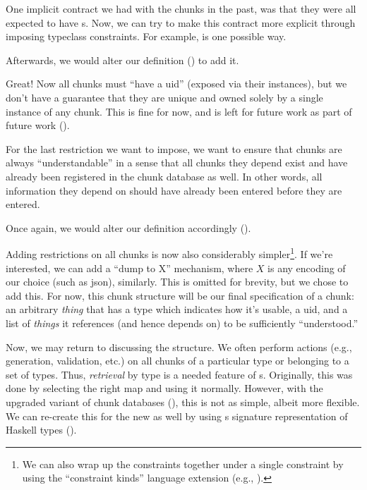 One implicit contract we had with the chunks in the past, was that they were all
expected to have \UID{}s. Now, we can try to make this contract more explicit
through imposing typeclass constraints. For example, 
is one possible way.

\uidOwnershipContract{}

Afterwards, we would alter our \Chunk{} definition
() to add it.

\chunksWithUidConstraint{}

Great! Now all chunks must ``have a \acs{uid}'' (exposed via their \HasUID{}
instances), but we don't have a guarantee that they are unique and owned solely
by a single instance of any chunk. This is fine for now, and is left for future
work as part of future work ().

For the last restriction we want to impose, we want to ensure that chunks are
always ``understandable'' in a sense that all chunks they depend exist and have
already been registered in the chunk database as well. In other words, all
information they depend on should have already been entered before they are
entered.

\chunkDependenciesContract{}

Once again, we would alter our \Chunk{} definition accordingly
().

\chunksWithUidAndRefListConstraint{}

Adding restrictions on all chunks is now also considerably simpler\footnote{We
can also wrap up the constraints together under a single constraint by using the
``constraint kinds'' language extension \cite{GHC2020ConstraintKinds} (e.g.,
).}. If we're interested, we can add a ``dump to X''
mechanism, where $X$ is any encoding of our choice (such as \acs{json}),
similarly. This is omitted for brevity, but we chose to add this. For now, this
chunk structure will be our final specification of a chunk: an arbitrary
\textit{thing} that has a type which indicates how it's usable, a \acs{uid}, and
a list of \textit{things} it references (and hence depends on) to be
sufficiently ``understood.''

Now, we may return to discussing the \ChunkDB{} structure. We often perform
actions (e.g., generation, validation, etc.) on all chunks of a particular type
or belonging to a set of types. Thus, \textit{retrieval} by type is a needed
feature of \ChunkDB{}s. Originally, this was done by selecting the right map and
using it normally. However, with the upgraded variant of chunk databases
(), this is not as simple, albeit more flexible. We
can re-create this for the new \ChunkDB{} as well by using
s \TypeRep{} signature representation of Haskell types
().

